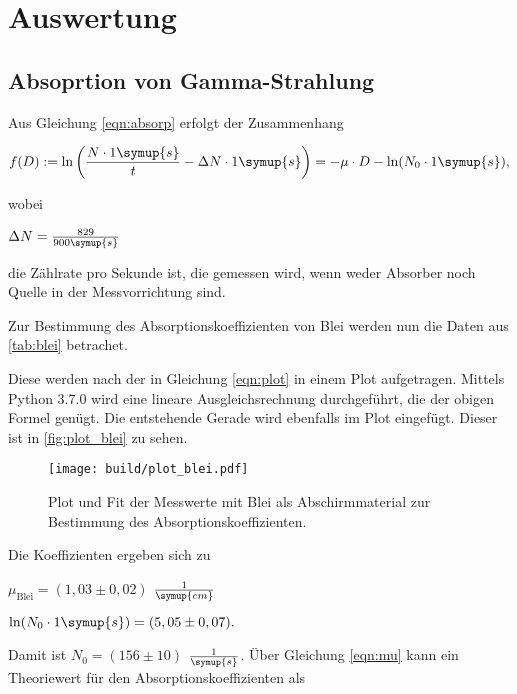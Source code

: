 \section{Auswertung}
\label{sec:Auswertung}

\subsection{Absoprtion von Gamma-Strahlung}

Aus Gleichung \eqref{eqn:absorp} erfolgt der Zusammenhang

\begin{equation}
    \label{eqn:plot}
    f(D) := \ln \bigg (\frac{ N \cdot 1 \symup{s}}{t} - \Delta N \cdot 1 \symup{s} \bigg) = - \mu \cdot D - \ln (N_0 \cdot 1 \symup{s}),
\end{equation}

wobei

\begin{center}
    $\Delta N = \frac{829}{900 \symup{s}}$
\end{center}

die Zählrate pro Sekunde ist, die gemessen wird, wenn weder Absorber noch Quelle in der Messvorrichtung sind.

Zur Bestimmung des Absorptionskoeffizienten von Blei werden nun die Daten aus \autoref{tab:blei} betrachet.



Diese werden nach der in Gleichung \eqref{eqn:plot} in einem Plot aufgetragen.
Mittels Python 3.7.0 wird eine lineare Ausgleichsrechnung durchgeführt, die der obigen Formel genügt.
Die entstehende Gerade wird ebenfalls im Plot eingefügt.
Dieser ist in \autoref{fig:plot_blei} zu sehen.

\begin{figure}
    \centering
    \texttt{[image: build/plot\_blei.pdf]}
    \caption{Plot und Fit der Messwerte mit Blei als Abschirmmaterial zur Bestimmung des Absorptionskoeffizienten.}
    \label{fig:plot_blei}
\end{figure}

Die Koeffizienten ergeben sich zu 

\begin{center}
    $\mu_\text{Blei} = (1,03 \pm 0,02)$ $\frac{1}{\symup{cm}}$

    $\ln ( N_ 0 \cdot 1 \symup{s}) = (5,05 \pm 0,07).$
\end{center}

Damit ist $N_0 = (156 \pm 10)$ $\frac{1}{\symup{s}}$.
Über Gleichung \eqref{eqn:mu} kann ein Theoriewert für den Absorptionskoeffizienten als

